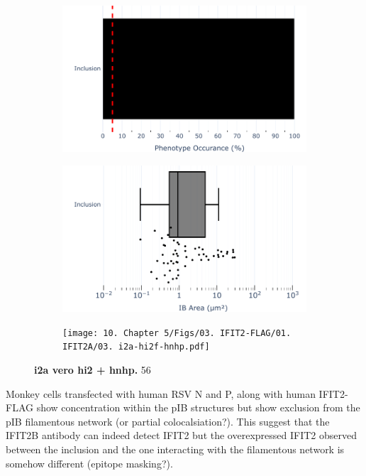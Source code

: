 \begin{figure}
    \begin{subfigure}{0.495\textwidth}
        \caption{}
        \includegraphics[width=1\linewidth]{10. Chapter 5/Figs/03. IFIT2-FLAG/01. IFIT2A/01. bar_i2a_hnhp.pdf} 
    \end{subfigure}
    \begin{subfigure}{0.495\textwidth}
        \caption{}
        \includegraphics[width=1\linewidth]{10. Chapter 5/Figs/03. IFIT2-FLAG/01. IFIT2A/02. box_i2a_hnhp.pdf}
    \end{subfigure}
    \begin{subfigure}{1\textwidth}
        \centering
        \caption{}
        \texttt{[image: 10. Chapter 5/Figs/03. IFIT2-FLAG/01. IFIT2A/03. i2a-hi2f-hnhp.pdf]}
    \end{subfigure}
    \caption[i2a vero hi2 + hnhp]{\textbf{i2a vero hi2 + hnhp.} 56}
    \label{fig:i2a vero hi2 + hnhp}
\end{figure}

Monkey cells transfected with human RSV N and P, along with human IFIT2-FLAG show concentration within the pIB structures but show exclusion from the pIB filamentous network (or partial colocalsiation?). This suggest that the IFIT2B antibody can indeed detect IFIT2 but the overexpressed IFIT2 observed between the inclusion and the one interacting with the filamentous network is somehow different (epitope masking?).

